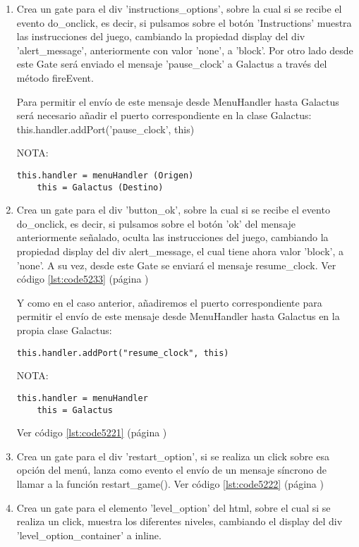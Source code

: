 \begin{enumerate}
 \item Crea un gate para el div 'instructions\_options', sobre la cual si se recibe el evento do\_onclick, es decir, si pulsamos sobre el 
 botón 'Instructions' muestra las instrucciones del juego, cambiando la propiedad display del div 'alert\_message', anteriormente con 
 valor 'none', a 'block'.
Por otro lado desde este Gate será enviado el mensaje 'pause\_clock' a Galactus a través del método fireEvent.       

Para permitir el envío de este mensaje desde MenuHandler hasta Galactus será necesario añadir el puerto correspondiente en la clase Galactus:
this.handler.addPort('pause\_clock', this)

NOTA: 
\begin{verbatim}
this.handler = menuHandler (Origen)
    this = Galactus (Destino)
\end{verbatim}

 \item Crea un gate para el div 'button\_ok', sobre la cual si se recibe el evento do\_onclick, es decir, si pulsamos sobre el botón 'ok' 
 del mensaje anteriormente señalado, oculta las instrucciones del juego, cambiando la propiedad display del div alert\_message, el cual tiene 
 ahora valor 'block', a 'none'. A su vez, desde este Gate se enviará el mensaje resume\_clock. 
 Ver código \ref{lst:code5233} (página \pageref{lst:code5233})

Y como en el caso anterior, añadiremos el puerto correspondiente para permitir el envío de este mensaje desde MenuHandler hasta Galactus en 
la propia clase Galactus:

\begin{verbatim}
this.handler.addPort("resume_clock", this)
\end{verbatim}

NOTA: 
\begin{verbatim}
this.handler = menuHandler
    this = Galactus
\end{verbatim}

Ver código \ref{lst:code5221} (página \pageref{lst:code5221})

 \item Crea un gate para el div 'restart\_option', si se realiza un click sobre esa opción del menú, lanza como evento el envío de un 
 mensaje síncrono de llamar a la función restart\_game(). Ver código \ref{lst:code5222} (página \pageref{lst:code5222})

 \item Crea un gate para el elemento 'level\_option' del html, sobre el cual si se realiza un click,
muestra los diferentes niveles, cambiando el display del div 'level\_option\_container' a inline.

\end{enumerate}

